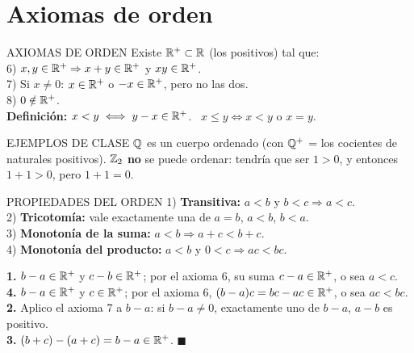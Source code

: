 \section{Axiomas de orden}
\apuntes
\begin{sello}{AXIOMAS DE ORDEN}
Existe $\mathbb{R}^+\subset\mathbb{R}$ (los positivos) tal que:\\[2pt]
6) $x,y\in\mathbb{R}^+\Rightarrow x+y\in\mathbb{R}^+$ y $xy\in\mathbb{R}^+$.\\
7) Si $x\neq0$: $x\in\mathbb{R}^+$ o $-x\in\mathbb{R}^+$, pero no las dos.\\
8) $0\notin\mathbb{R}^+$.\\[3pt]
\textbf{Definición:} $x<y\iff y-x\in\mathbb{R}^+$. \ $x\le y\iff x<y$ o $x=y$.
\end{sello}
\begin{memo}{EJEMPLOS DE CLASE}
$\mathbb{Q}$ es un cuerpo ordenado (con $\mathbb{Q}^+$ = los cocientes de naturales positivos). $\mathbb{Z}_2$ \textbf{no} se puede ordenar: tendría que ser $1>0$, y entonces $1+1>0$, pero $1+1=0$.
\end{memo}
\apuntes
\begin{sello}{PROPIEDADES DEL ORDEN}
1) \textbf{Transitiva:} $a<b$ y $b<c\Rightarrow a<c$.\\
2) \textbf{Tricotomía:} vale exactamente una de $a=b$, $a<b$, $b<a$.\\
3) \textbf{Monotonía de la suma:} $a<b\Rightarrow a+c<b+c$.\\
4) \textbf{Monotonía del producto:} $a<b$ y $0<c\Rightarrow ac<bc$.
\end{sello}
\begin{demo}
\textbf{1.} $b-a\in\mathbb{R}^+$ y $c-b\in\mathbb{R}^+$; por el axioma 6, su suma $c-a\in\mathbb{R}^+$, o sea $a<c$.\\[2pt]
\textbf{4.} $b-a\in\mathbb{R}^+$ y $c\in\mathbb{R}^+$; por el axioma 6, $(b-a)c=bc-ac\in\mathbb{R}^+$, o sea $ac<bc$.\\[2pt]
\agregado
\textbf{2.} Aplico el axioma 7 a $b-a$: si $b-a\neq0$, exactamente uno de $b-a$, $a-b$ es positivo. \\[2pt]
\textbf{3.} $(b+c)-(a+c)=b-a\in\mathbb{R}^+$. $\blacksquare$
\end{demo}

